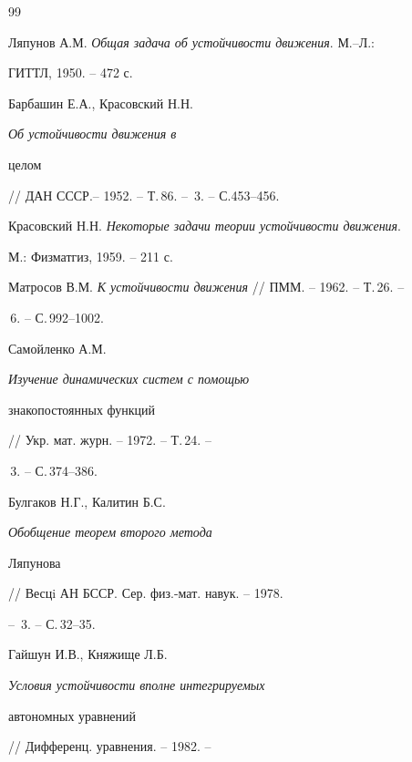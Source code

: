 \begin{thebibliography}{99} 


 




Ляпунов А.М. {\em Общая задача об устойчивости движения}. М.--Л.: 


ГИТТЛ, 1950. -- 472 с. 


 




Барбашин Е.А., Красовский Н.Н. {\em Об устойчивости движения в 


целом} // ДАН СССР.-- 1952. -- Т.\,86. -- \No\,3. -- С.453--456. 


 




Красовский Н.Н. {\em Некоторые задачи теории устойчивости движения}. 


М.: Физматгиз, 1959. -- 211 с. 


 




Матросов В.М. {\em К устойчивости движения} // ПММ. -- 1962. -- Т.\,26. -- 


\No\,6. -- С.\,992--1002. 


 




Самойленко А.М. {\em Изучение динамических систем с помощью 


знакопостоянных функций} // Укр. мат. журн. -- 1972. -- Т.\,24. -- 


\No\,3. -- С.\,374--386.


 




Булгаков Н.Г., Калитин Б.С. {\em Обобщение теорем второго метода 


Ляпунова} // Весцi АН БССР. Сер. физ.-мат. навук. -- 1978. 


-- \No\,3. -- С.\,32--35. 


 




Гайшун И.В., Княжище Л.Б. {\em Условия устойчивости вполне интегрируемых 


автономных уравнений} // Дифференц. уравнения. -- 1982. -- 



\end{thebibliography}
